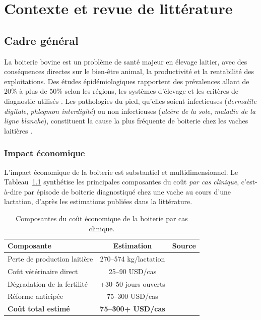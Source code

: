 \chapter{Contexte et revue de littérature}
\label{chapitre:contexte}

\section{Cadre général}

La boiterie bovine est un problème de santé majeur en élevage laitier, avec des conséquences
directes sur le bien-être animal, la productivité et la rentabilité des exploitations.
Des études épidémiologiques rapportent des prévalences allant de 20\% à plus de 50\% selon
les régions, les systèmes d'élevage et les critères de diagnostic utilisés
\citep{whay2003assessment,cook2003prevalence}. Les pathologies du pied, qu'elles soient
infectieuses (\textit{dermatite digitale}, \textit{phlegmon interdigité}) ou non
infectieuses (\textit{ulcère de la sole}, \textit{maladie de la ligne blanche}),
constituent la cause la plus fréquente de boiterie chez les vaches laitières
\citep{merck_hoof_origin_lameness_cattle,flower2006effect}.

\subsection{Impact économique}
L'impact économique de la boiterie est substantiel et multidimensionnel. Le
Tableau~\ref{tab:impact_economique} synthétise les principales composantes du coût
\textit{par cas clinique}, c'est-à-dire par épisode de boiterie diagnostiqué chez une
vache au cours d'une lactation, d'après les estimations publiées dans la littérature.

\begin{table}[H]
    \centering
    \caption{Composantes du coût économique de la boiterie par cas clinique.}
    \label{tab:impact_economique}
    \begin{tabular}{lcc}
        \toprule
        \textbf{Composante} & \textbf{Estimation} & \textbf{Source} \\
        \midrule
        Perte de production laitière & 270--574 kg/lactation & \cite{green2002financial} \\
        Coût vétérinaire direct & 25--90 USD/cas & \cite{bruijnis2010assessing} \\
        Dégradation de la fertilité & +30--50 jours ouverts & \cite{green2002financial} \\
        Réforme anticipée & 75--300 USD/cas & \cite{bruijnis2010assessing} \\
        \midrule
        \textbf{Coût total estimé} & \textbf{75--300+ USD/cas} & \\
        \bottomrule
    \end{tabular}
\end{table}
\vspace{-0.9\baselineskip}


